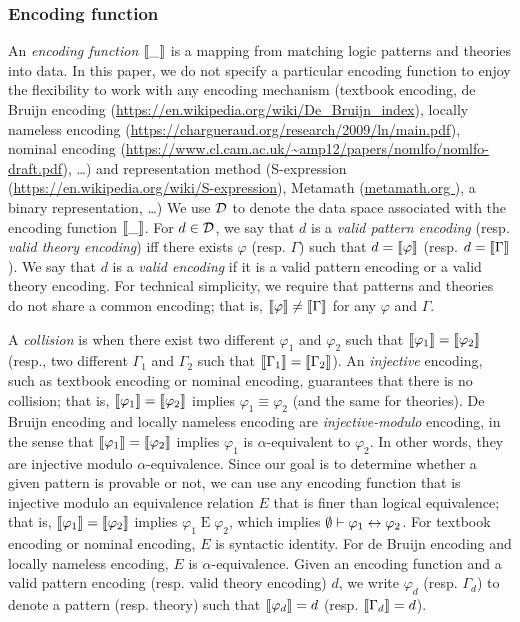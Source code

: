 \documentclass{article}
\begin{document}
\subsubsection{Encoding function}

An \emph{encoding function} $\left\llbracket \_ \right\rrbracket$
is a mapping from matching logic patterns and theories into data.
In this paper, we do not specify a particular encoding function
to enjoy the flexibility to work with
any encoding mechanism
(textbook encoding, de Bruijn encoding (\url{https://en.wikipedia.org/wiki/De_Bruijn_index}),
locally nameless encoding (\url{https://chargueraud.org/research/2009/ln/main.pdf}),
nominal encoding (\url{https://www.cl.cam.ac.uk/~amp12/papers/nomlfo/nomlfo-draft.pdf}), \ldots)
and representation method
(S-expression (\url{https://en.wikipedia.org/wiki/S-expression}),
 Metamath (\url{metamath.org }), a binary representation, \ldots)
We use $\mathcal{D}$ to denote the data space associated with the encoding function
$\left\llbracket \_ \right\rrbracket$.
For $d \in \mathcal{D}$,
we say that $d$ is a \emph{valid pattern encoding}
(resp. \emph{valid theory encoding}) iff
there exists $\varphi$ (resp. $\Gamma$)
such that $d = \left\llbracket \varphi \right\rrbracket$ (resp. $d = \left\llbracket \Gamma \right\rrbracket$).
We say that $d$ is a \emph{valid encoding} if it is
a valid pattern encoding or a valid theory encoding.
For technical simplicity, we require that patterns and theories
do not share a common encoding; that is,
$\left\llbracket \varphi \right\rrbracket \neq \left\llbracket \Gamma \right\rrbracket$ for any $\varphi$ and $\Gamma$.


A \emph{collision} is when there exist two different $\varphi_1$ and $\varphi_2$ such that $\left\llbracket \varphi_1 \right\rrbracket = \left\llbracket \varphi_2 \right\rrbracket$
(resp., two different $\Gamma_1$ and $\Gamma_2$ such that $\left\llbracket \Gamma_1 \right\rrbracket = \left\llbracket \Gamma_2 \right\rrbracket$).
An \emph{injective} encoding, such as textbook encoding or nominal encoding,
guarantees that there is no collision;
that is, $\left\llbracket \varphi_1 \right\rrbracket = \left\llbracket \varphi_2 \right\rrbracket$ implies $\varphi_1 \equiv \varphi_2$
(and the same for theories).
De Bruijn encoding and locally nameless encoding are \emph{injective-modulo} encoding, in the sense that
$\left\llbracket \varphi_1 \right\rrbracket = \left\llbracket \varphi_2 \right\rrbracket$ implies $\varphi_1$ is $\alpha$-equivalent to
$\varphi_2$.
In other words, they are injective modulo $\alpha$-equivalence.
Since our goal is to determine whether a given pattern is provable or not,
we can use any encoding function that is injective modulo an equivalence relation $E$
that is finer than logical equivalence;
that is, $\left\llbracket \varphi_1 \right\rrbracket = \left\llbracket \varphi_2 \right\rrbracket$ implies $\varphi_1 \mathbin{E} \varphi_2$, which implies $\emptyset \vdash \varphi_1 \leftrightarrow \varphi_2$.
For textbook encoding or nominal encoding, $E$ is syntactic identity.
For de Bruijn encoding and locally nameless encoding, $E$ is $\alpha$-equivalence.
Given an encoding function and a valid pattern encoding
(resp. valid theory encoding) $d$,
we write $\varphi_d$ (resp. $\Gamma_d$) to denote a pattern (resp. theory)
such that $\left\llbracket \varphi_d \right\rrbracket = d$ (resp. $\left\llbracket \Gamma_d \right\rrbracket = d$).
\end{document}
